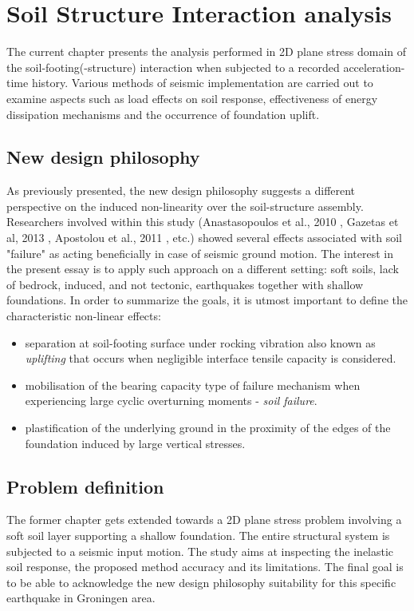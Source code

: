 	\chapter{Soil Structure Interaction analysis} \label{ch6}
	
	The current chapter presents the analysis performed in 2D plane stress domain of the soil-footing(-structure) interaction when subjected to a recorded acceleration-time history. Various methods of seismic implementation are carried out to examine aspects such as load effects on soil response, effectiveness of energy dissipation mechanisms and the occurrence of foundation uplift.
	
	\section{New design philosophy}
	As previously presented, the new design philosophy suggests a different perspective on the induced non-linearity over the soil-structure assembly. Researchers involved within this study (Anastasopoulos et al., 2010 \cite{anastasopoulos2010soil}, Gazetas et al, 2013 \cite{gazetas2013nonlinear}, Apostolou et al., 2011 \cite{apostolou2011soil}, etc.) showed \mbox{several} effects associated with soil "failure" as acting beneficially in case of seismic ground motion. The interest in the present essay is to apply such approach on a different setting: soft soils, lack of bedrock, induced, and not tectonic, earthquakes together with shallow foundations. In order to summarize the goals, it is utmost important to define the characteristic non-linear effects:
	\begin{itemize}
		\item separation at soil-footing surface under rocking vibration also known as \textit{uplifting} that occurs when negligible interface tensile capacity is considered.
		\item mobilisation of the bearing capacity type of failure mechanism  when experiencing large cyclic overturning moments - \textit{soil failure}.
		\item plastification of the underlying ground in the proximity of the edges of the foundation \mbox{induced} by large vertical stresses.
	\end{itemize} 
	
	\section{Problem definition}
	The former chapter gets extended towards a 2D plane stress problem involving a soft soil layer supporting a shallow foundation. The entire structural system is subjected to a seismic input motion. The study aims at inspecting the inelastic soil response, the proposed method accuracy and its limitations. The final goal is to be able to acknowledge the new design philosophy suitability for this specific earthquake in Groningen area.
	
